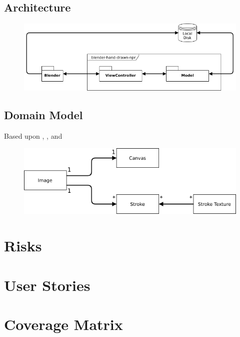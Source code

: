 \documentclass[a4paper,10pt]{article}
\begin{document}
\subsection{Architecture}

\begin{figure}[H]
\includegraphics[width=\textwidth]{arch}
\centering
\end{figure}

\subsection{Domain Model}

Based upon \citep{hertzmann2002}, \citep{salisbury1994}, \citep{salisbury1996} and \citep{winkenbach1994}
\begin{figure}[H]
\includegraphics[width=\textwidth]{domain}
\centering
\end{figure}

\section{Risks}


\newpage
\section{User Stories} \label{userstories}


\appendix
\newpage
\section{Coverage Matrix} \label{coveragematrix}
\end{document}
